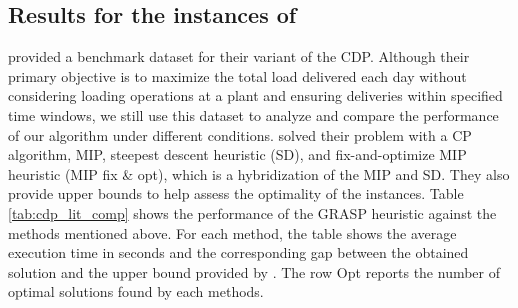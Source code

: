 \documentclass{article}
\begin{document}
\subsection{Results for the instances of \cite{kinable2014concrete}}

\cite{kinable2014concrete} provided a benchmark dataset for their variant of the CDP. Although their primary objective is to maximize the total load delivered each day without considering loading operations at a plant and ensuring deliveries within specified time windows, we still use this dataset to analyze and compare the performance of our algorithm under different conditions. \cite{kinable2014concrete} solved their problem with a CP algorithm, MIP, steepest descent heuristic (SD), and fix-and-optimize MIP heuristic (MIP fix \& opt), which is a hybridization of the MIP and SD. They also provide upper bounds to help assess the optimality of the instances. Table \ref{tab:cdp_lit_comp} shows the performance of the GRASP heuristic against the methods mentioned above. For each method, the table shows the average execution time in seconds and the corresponding gap between the obtained solution and the upper bound provided by \cite{kinable2014concrete}. The row Opt reports the number of optimal solutions found by each methods.
\end{document}
